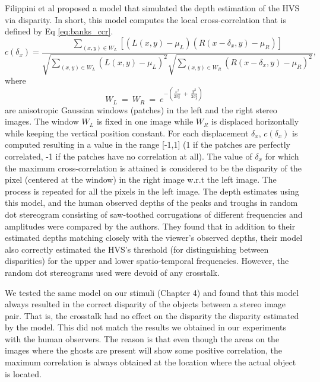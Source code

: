 Filippini et al \cite{filippini2009limits} proposed a model that simulated the depth estimation of the HVS via disparity. In short, this model computes the local cross-correlation that is defined by Eq \ref{eq:banks_ccr}.
\begin{equation}
c(\delta_x) = \frac{ \sum\limits_{(x,y) \in W_L} [(L(x,y) - \mu_L)(R(x-\delta_x, y) - \mu_R)] }{\sqrt{\sum\limits_{(x,y) \in W_L}(L(x,y) - \mu_L)^2} \sqrt{\sum\limits_{(x,y) \in W_R}(R(x-\delta_x, y)- \mu_R)^2}},
\label{eq:banks_ccr}
\end{equation}
where
\begin{equation}
W_L \:=\: W_R \:=\: e^{-\left(\frac{x^2}{2\sigma_x^2} \:+\: \frac{y^2}{2\sigma_y^2}\right)}
\label{ccr_windows}
\end{equation}
are anisotropic Gaussian windows (patches) in the left and the right stereo images. The window $W_L$ is fixed in one image while $W_R$ is displaced horizontally while keeping the vertical position constant. For each displacement $\delta_x$, $c(\delta_x)$ is computed resulting in a value in the range [-1,1] (1 if the patches are perfectly correlated, -1 if the patches have no correlation at all). The value of $\delta_x$ for which the maximum cross-correlation is attained is considered to be the disparity of the pixel (centered at the window) in the right image w.r.t the left image. The process is repeated for all the pixels in the left image. The depth estimates using this model, and the human observed depths of the peaks and troughs in random dot stereogram consisting of saw-toothed corrugations of different frequencies and amplitudes were compared by the authors. They found that in addition to their estimated depths matching closely with the viewer's observed depths, their model also correctly estimated the HVS's threshold (for distinguishing between disparities) for the upper and lower spatio-temporal frequencies. However, the random dot stereograms used were devoid of any crosstalk.

We tested the same model on our stimuli (Chapter 4) and found that this model always resulted in the correct disparity of the objects between a stereo image pair. That is, the crosstalk had no effect on the disparity the disparity estimated by the model. This did not match the results we obtained in our experiments with the human observers. The reason is that even though the areas on the images where the ghosts are present will show some positive correlation, the maximum correlation is always obtained at the location where the actual object is located.

